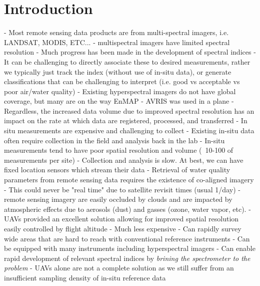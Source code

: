 \documentclass[journal,article,submit,pdftex,moreauthors]{Definitions/mdpi}
\begin{document}
\section{Introduction}






- Most remote sensing data products are from multi-spectral imagers, i.e. LANDSAT, MODIS, ETC... 
    - multispectral imagers have limited spectral resolution 
    - Much progress has been made in the development of spectral indices
    - It can be challenging to directly associate these to desired measurements, rather we typically just track the index (without use of in-situ data), or generate classifications that can be challenging to interpret (i.e. good vs acceptable vs poor air/water quality)
- Existing hyperspectral imagers do not have global coverage, but many are on the way EnMAP
    - AVRIS was used in a plane 
    - Regardless, the increased data volume due to improved spectral resolution has an impact on the rate at which data are registered, processed, and transferred
- In situ measurements are expensive and challenging to collect
    - Existing in-situ data often require collection in the field and analysis back in the lab
    - In-situ measurements tend to have poor spatial resolution and volume (~10-100 of measurements per site)
    - Collection and analysis is slow. At best, we can have fixed location sensors which stream their data
- Retrieval of water quality parameters from remote sensing data requires the existence of co-aligned imagery
    - This could never be "real time" due to satellite revisit times (usual 1/day) 
    - remote sensing imagery are easily occluded by clouds and are impacted by atmospheric effects due to aerosols (dust) and gasses (ozone, water vapor, etc). 
- UAVs provided an excellent solution allowing for improved spatial resolution easily controlled by flight altitude
    - Much less expensive
    - Can rapidly survey wide areas that are hard to reach with conventional reference instruments
    - Can be equipped with many instruments including hyperspectral imagers
    - Can enable rapid development of relevant spectral indices by \textit{brining the spectrometer to the problem}
- UAVs alone are not a complete solution as we still suffer from an insufficient sampling density of in-situ reference data
\end{document}
